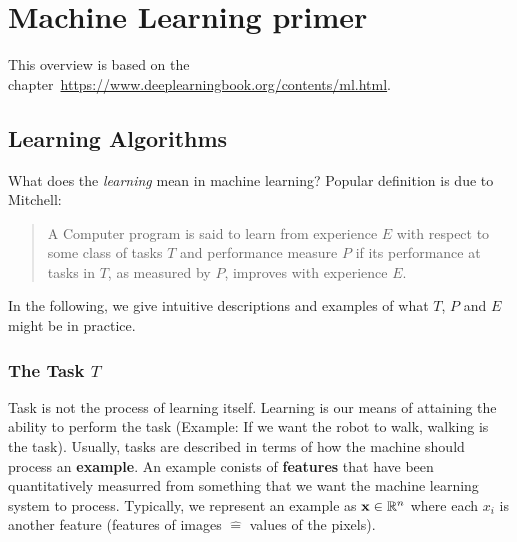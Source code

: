 \chapter{Machine Learning primer}
This overview is based on the
chapter~\url{https://www.deeplearningbook.org/contents/ml.html}.

\section{Learning Algorithms}
What does the \emph{learning} mean in machine learning? Popular
definition is due to Mitchell:
\begin{quotation}
  A Computer program is said to learn from experience $E$ with respect
  to some class of tasks $T$ and performance measure $P$ if its
  performance at tasks in $T$, as measured by $P$, improves with
  experience $E$.
\end{quotation}
In the following, we give intuitive descriptions and examples of what
$T$, $P$ and $E$ might be in practice.

\subsection*{The Task $T$}
Task is not the process of learning itself. Learning is our means of
attaining the ability to perform the task (Example: If we want the
robot to walk, walking is the task). Usually, tasks are described in
terms of how the machine should process an \textbf{example}. An
example conists of \textbf{features} that have been quantitatively
measurred from something that we want the machine learning system to
process. Typically, we represent an example as $\mathbf{x} \in \mathbb{R}^n$
where each $x_i$ is another feature (features of images $\hat=$ values
of the pixels).

